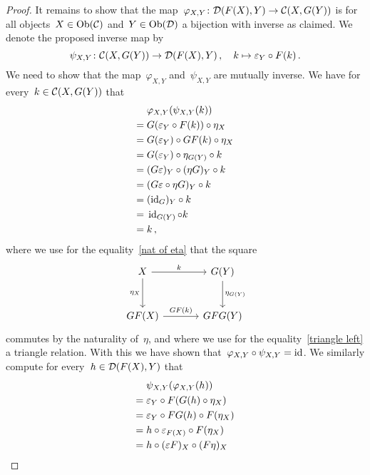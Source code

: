 \begin{proof}
  It remains to show that the map~$\varphi_{X,Y} \colon \mathcal{D}(F(X), Y) \to \mathcal{C}(X, G(Y))$ is for all objects~$X \in \operatorname{Ob}(\mathcal{C})$ and~$Y \in \operatorname{Ob}(\mathcal{D})$ a bijection with inverse as claimed.
  We denote the proposed inverse map by
  \[
            \psi_{X,Y}
    \colon  \mathcal{C}(X, G(Y))
    \to     \mathcal{D}(F(X), Y) \,,
    \quad   k
    \mapsto \varepsilon_Y \circ F(k) \,.
  \]
  We need to show that the map~$\varphi_{X,Y}$ and~$\psi_{X,Y}$ are mutually inverse.
  We have for every~$k \in \mathcal{C}(X,G(Y))$ that
  \begin{align}
     {}&  \varphi_{X,Y}( \psi_{X,Y}( k ) )  \notag  \\
    ={}&  G( \varepsilon_Y \circ F(k) ) \circ \eta_X  \notag  \\
    ={}&  G(\varepsilon_Y) \circ GF(k) \circ \eta_X \notag  \\
    ={}&  G(\varepsilon_Y) \circ \eta_{G(Y)} \circ k  \label{nat of eta}  \\
    ={}&  (G \varepsilon)_Y \circ (\eta G)_Y \circ k  \notag  \\
    ={}&  (G \varepsilon \circ \eta G)_Y \circ k  \notag  \\
    ={}&  (\operatorname{id}_G)_Y \circ k \label{triangle left} \\
    ={}&  \operatorname{id}_{G(Y)}  \circ k \notag  \\
    ={}&  k \notag \,,
  \end{align}
  where we use for the equality~\eqref{nat of eta} that the square
  \[
    \begin{tikzcd}[sep = large]
        X
        \arrow{r}[above]{k}
        \arrow{d}[left]{\eta_X}
      & G(Y)
        \arrow{d}[right]{\eta_{G(Y)}}
    \\
        GF(X)
        \arrow{r}[above]{GF(k)}
      & GFG(Y)
    \end{tikzcd}
  \]
  commutes by the naturality of~$\eta$, and where we use for the equality~\eqref{triangle left} a triangle relation.
  With this we have shown that~$\varphi_{X,Y} \circ \psi_{X,Y} = \operatorname{id}$.
  We similarly compute for every~$h \in \mathcal{D}(F(X), Y)$ that
  \begin{align}
     {}&  \psi_{X,Y}( \varphi_{X,Y}( h ) )  \notag  \\
    ={}&  \varepsilon_Y \circ F(G(h) \circ \eta_X)  \notag  \\
    ={}&  \varepsilon_Y \circ FG(h) \circ F(\eta_X) \notag  \\
    ={}&  h \circ \varepsilon_{F(X)} \circ F(\eta_X)  \label{nat of eps}  \\
    ={}&  h \circ (\varepsilon F)_X \circ (F \eta)_X  \notag  \\

\end{align}
\end{proof}
